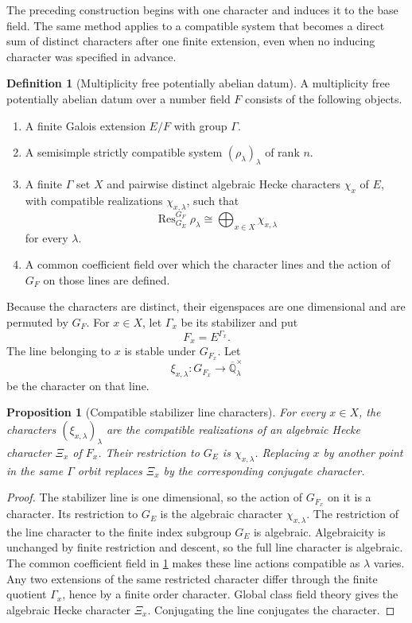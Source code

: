 \documentclass{aomart}
\newtheorem{proposition}[proposition]{Proposition}
\theoremstyle{definition}
\newtheorem{definition}[definition]{Definition}
\theoremstyle{remark}
\newcommand{\QQ}{\mathbb Q}
\newcommand{\Res}{\operatorname{Res}}
\begin{document}
The preceding construction begins with one character and induces it to the base field. The same method applies to a compatible system that becomes a direct sum of distinct characters after one finite extension, even when no inducing character was specified in advance.

\begin{definition}[Multiplicity free potentially abelian datum]\label{def:potentially_abelian}
A multiplicity free potentially abelian datum over a number field \(F\) consists of the following objects.

\begin{enumerate}
\item A finite Galois extension \(E/F\) with group \(\Gamma\).
\item A semisimple strictly compatible system \((\rho_\lambda)_\lambda\) of rank \(n\).
\item A finite \(\Gamma\) set \(X\) and pairwise distinct algebraic Hecke characters \(\chi_x\) of \(E\), with compatible realizations \(\chi_{x,\lambda}\), such that
\[
\boxed{
\Res_{G_E}^{G_F}\rho_\lambda
\cong
\bigoplus_{x\in X}\chi_{x,\lambda}
}
\]
for every \(\lambda\).
\item A common coefficient field over which the character lines and the action of \(G_F\) on those lines are defined.
\end{enumerate}
\end{definition}

Because the characters are distinct, their eigenspaces are one dimensional and are permuted by \(G_F\). For \(x\in X\), let \(\Gamma_x\) be its stabilizer and put
\[
F_x=E^{\Gamma_x}.
\]
The line belonging to \(x\) is stable under \(G_{F_x}\). Let
\[
\xi_{x,\lambda}:G_{F_x}\longrightarrow\overline{\QQ}_\lambda^\times
\]
be the character on that line.

\begin{proposition}[Compatible stabilizer line characters]\label{prop:potential_line_character}
For every \(x\in X\), the characters \((\xi_{x,\lambda})_\lambda\) are the compatible realizations of an algebraic Hecke character \(\Xi_x\) of \(F_x\). Their restriction to \(G_E\) is \(\chi_{x,\lambda}\). Replacing \(x\) by another point in the same \(\Gamma\) orbit replaces \(\Xi_x\) by the corresponding conjugate character.
\end{proposition}

\begin{proof}
The stabilizer line is one dimensional, so the action of \(G_{F_x}\) on it is a character. Its restriction to \(G_E\) is the algebraic character \(\chi_{x,\lambda}\). The restriction of the line character to the finite index subgroup \(G_E\) is algebraic. Algebraicity is unchanged by finite restriction and descent, so the full line character is algebraic. The common coefficient field in \cref{def:potentially_abelian} makes these line actions compatible as \(\lambda\) varies. Any two extensions of the same restricted character differ through the finite quotient \(\Gamma_x\), hence by a finite order character. Global class field theory gives the algebraic Hecke character \(\Xi_x\). Conjugating the line conjugates the character.
\end{proof}
\end{document}
